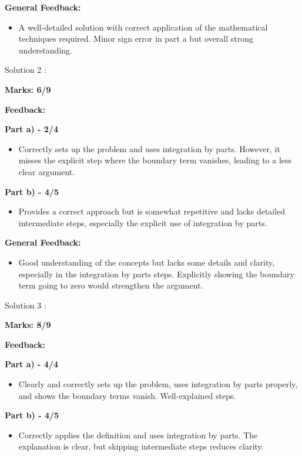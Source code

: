 \documentclass[a4paper,11pt]{article}
\begin{document}
\textbf{General Feedback:}

\begin{itemize}
    \item A well-detailed solution with correct application of the mathematical techniques required. Minor sign error in part a but overall strong understanding.
\end{itemize}


Solution 2 :

\textbf{Marks: 6/9}

\textbf{Feedback:}

\textbf{Part a) - 2/4}

\begin{itemize}
    \item Correctly sets up the problem and uses integration by parts. However, it misses the explicit step where the boundary term vanishes, leading to a less clear argument.
\end{itemize}

\textbf{Part b) - 4/5}

\begin{itemize}
    \item Provides a correct approach but is somewhat repetitive and lacks detailed intermediate steps, especially the explicit use of integration by parts.
\end{itemize}

\textbf{General Feedback:}

\begin{itemize}
    \item Good understanding of the concepts but lacks some details and clarity, especially in the integration by parts steps. Explicitly showing the boundary term going to zero would strengthen the argument.
\end{itemize}


Solution 3 :

\textbf{Marks: 8/9}

\textbf{Feedback:}

\textbf{Part a) - 4/4}

\begin{itemize}
    \item Clearly and correctly sets up the problem, uses integration by parts properly, and shows the boundary terms vanish. Well-explained steps.
\end{itemize}

\textbf{Part b) - 4/5}

\begin{itemize}
    \item Correctly applies the definition and uses integration by parts. The explanation is clear, but skipping intermediate steps reduces clarity.
\end{itemize}
\end{document}
